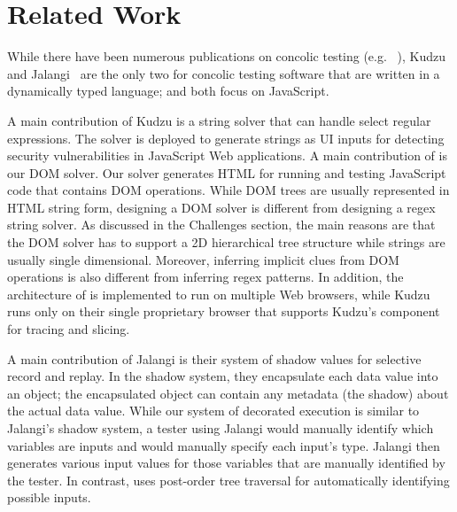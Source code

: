 \section{Related Work}


While there have been numerous publications on concolic testing (e.g. ~\cite{cute, klee, eventConcolic}), 
Kudzu~\cite{kudzu} and Jalangi~\cite{jalangi} are the only two for concolic testing software that are written in a dynamically typed language; and both focus on JavaScript.  

A main contribution of Kudzu is a string solver that can handle select regular expressions.  
The solver is deployed to generate strings as UI inputs for detecting security vulnerabilities in JavaScript Web applications.   
A main contribution of \tool is our DOM solver.  Our solver generates HTML for running and testing JavaScript code that contains DOM operations.    
While DOM trees are usually represented in HTML string form, designing a DOM solver is different from designing a regex string solver.
As discussed in the Challenges section, the main reasons are that the DOM solver has to support a 2D hierarchical tree structure while strings are usually single dimensional.  
Moreover, inferring implicit clues from DOM operations is also different from inferring regex patterns.  
In addition, the architecture of \tool is implemented to run on multiple Web browsers, while Kudzu runs only on their single proprietary browser that supports Kudzu's component~\cite{flax} for tracing and slicing.    

A main contribution of Jalangi is their system of shadow values for selective record and replay.  
In the shadow system, they encapsulate each data value into an object; the encapsulated object can contain any metadata (the shadow) about the actual data value.  
While our system of decorated execution is similar to Jalangi's shadow system, a tester using Jalangi would manually identify which variables are inputs and would manually specify each input's type.  
Jalangi then generates various input values for those variables that are manually identified by the tester.  
In contrast, \tool uses post-order tree traversal for automatically identifying possible inputs.  

